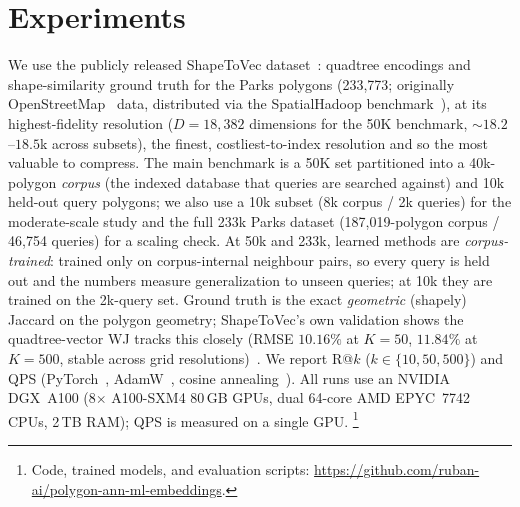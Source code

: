 \documentclass[conference]{IEEEtran}
\begin{document}
\section{Experiments}
\label{sec:exp}
We use the publicly released ShapeToVec dataset~\cite{shapetovec-data}: quadtree
encodings and shape-similarity ground truth for the Parks polygons (233{,}773;
originally OpenStreetMap~\cite{osm} data, distributed via the SpatialHadoop
benchmark~\cite{eldawy15}), at its highest-fidelity resolution
($D{=}18{,}382$ dimensions for the 50K benchmark, ${\sim}18.2$--$18.5$k across
subsets), the finest, costliest-to-index resolution and so the most valuable to
compress. The main benchmark is a 50K set partitioned into a 40k-polygon \emph{corpus}
(the indexed database that queries are searched against) and 10k held-out query
polygons; we also use a 10k subset (8k corpus / 2k queries) for the moderate-scale
study and the full 233k Parks dataset (187,019-polygon corpus / 46{,}754 queries) for
a scaling check. At 50k and 233k, learned methods are \emph{corpus-trained}: trained only on
corpus-internal neighbour pairs, so every query is held out and the numbers measure
generalization to unseen queries; at 10k they are trained on the 2k-query set. Ground
truth is the exact \emph{geometric} (shapely) Jaccard on the polygon geometry;
ShapeToVec's own validation shows the quadtree-vector WJ tracks this closely (RMSE
$10.16\%$ at $K{=}50$, $11.84\%$ at $K{=}500$, stable across grid
resolutions)~\cite{shape2vec}. We report R@$k$ ($k\in\{10,50,500\}$) and QPS (PyTorch~\cite{paszke19},
AdamW~\cite{loshchilov19}, cosine annealing~\cite{loshchilov17}). All runs use an
NVIDIA DGX~A100 (8$\times$ A100-SXM4 80\,GB GPUs, dual 64-core AMD EPYC~7742 CPUs,
2\,TB RAM); QPS is measured on a single GPU. \footnote{Code, trained models, and
evaluation scripts: \url{https://github.com/ruban-ai/polygon-ann-ml-embeddings}.}
\end{document}
